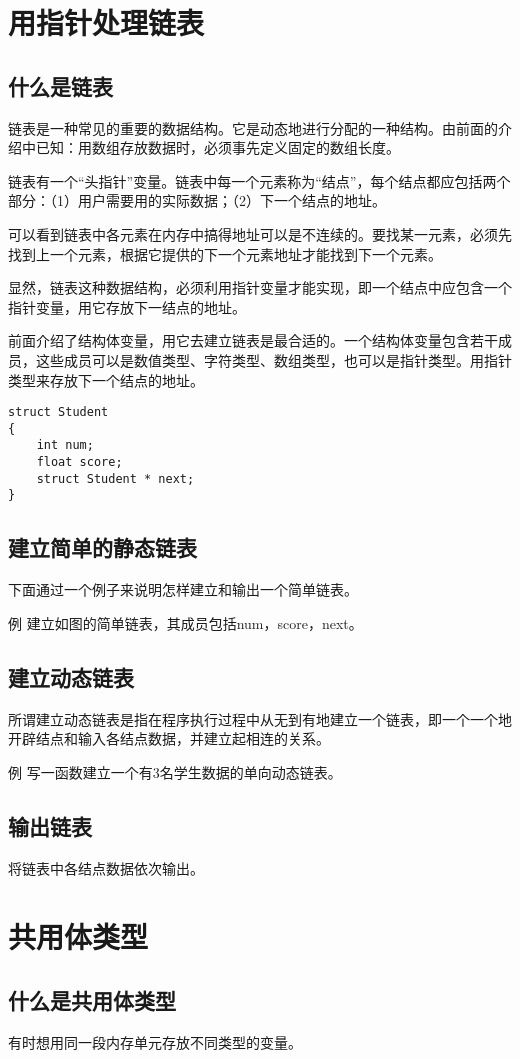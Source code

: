 \section{用指针处理链表}
\subsection{什么是链表}
链表是一种常见的重要的数据结构。它是动态地进行分配的一种结构。由前面的介绍中已知：用数组存放数据时，必须事先定义固定的数组长度。

链表有一个“头指针”变量。链表中每一个元素称为“结点”，每个结点都应包括两个部分：（1）用户需要用的实际数据；（2）下一个结点的地址。

可以看到链表中各元素在内存中搞得地址可以是不连续的。要找某一元素，必须先找到上一个元素，根据它提供的下一个元素地址才能找到下一个元素。

显然，链表这种数据结构，必须利用指针变量才能实现，即一个结点中应包含一个指针变量，用它存放下一结点的地址。

前面介绍了结构体变量，用它去建立链表是最合适的。一个结构体变量包含若干成员，这些成员可以是数值类型、字符类型、数组类型，也可以是指针类型。用指针类型来存放下一个结点的地址。
\begin{lstlisting}
struct Student
{
	int num;
	float score;
	struct Student * next;
}
\end{lstlisting}
\subsection{建立简单的静态链表}
下面通过一个例子来说明怎样建立和输出一个简单链表。

例 建立如图的简单链表，其成员包括num，score，next。
\subsection{建立动态链表}
所谓建立动态链表是指在程序执行过程中从无到有地建立一个链表，即一个一个地开辟结点和输入各结点数据，并建立起相连的关系。

例 写一函数建立一个有3名学生数据的单向动态链表。
\subsection{输出链表}
将链表中各结点数据依次输出。
\section{共用体类型}
\subsection{什么是共用体类型}
有时想用同一段内存单元存放不同类型的变量。
